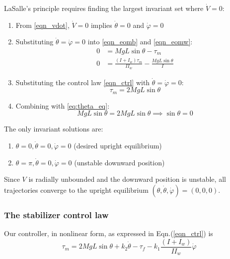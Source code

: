 \documentclass{article}
\begin{document}
LaSalle's principle requires finding the largest invariant set where $\dot{V} = 0$:

\begin{enumerate}
  \item From \eqref{eqn_vdot}, $\dot{V} = 0$ implies $\dot{\theta} = 0$ and $\dot{\varphi} = 0$

  \item Substituting $\dot{\theta} = \dot{\varphi} = 0$ into \eqref{eqn_eomb} and \eqref{eqn_eomw}:
  \begin{align}
    0 &= MgL\sin\theta - \tau_m \label{eq:theta_eq} \\
    0 &= \frac{(I + I_w)\tau_m}{I I_w} - \frac{MgL\sin\theta}{I} \label{eq:phi_eq}
  \end{align}

  \item Substituting the control law \eqref{eqn_ctrl} with $\dot{\theta} = \dot{\varphi} = 0$:
  \begin{equation}
    \tau_m = 2MgL\sin\theta
  \end{equation}

  \item Combining with \eqref{eq:theta_eq}:
  \begin{equation}
      MgL\sin\theta = 2MgL\sin\theta \implies \sin\theta = 0
  \end{equation}
\end{enumerate}

The only invariant solutions are:
\begin{enumerate}
  \item$\theta=0,\dot{\theta}=0,\dot{\varphi}=0$ (desired upright equilibrium)
  \item$\theta=\pi,\dot{\theta}=0,\dot{\varphi}=0$ (unstable downward position)
\end{enumerate}

Since $V$ is radially unbounded and the downward position is unstable, all trajectories converge to the upright equilibrium $(\theta, \dot{\theta}, \dot{\varphi}) = (0, 0, 0)$.

\subsubsection*{The stabilizer control law}

Our controller, in nonlinear form, as expressed in Eqn.(\ref{eqn_ctrl}) is
\begin{equation*}
  \tau_m=2MgL\sin\theta+k_{2}\dot{\theta}-\tau_{f}-k_1\frac{(I+I_w)}{II_w}\dot{\varphi}
\end{equation*}
\end{document}
